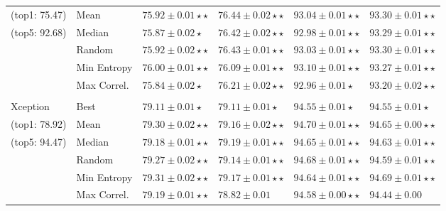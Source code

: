 \documentclass{elsarticle}
\begin{document}
\begin{table}[h!]
\begin{tabularx}{\textwidth}{XX|YY|YY}
		(top1: 75.47)                    & Mean                     & $75.92 \pm 0.01 \star\star$          & $\mathbf{76.44 \pm 0.02} \star\star$ & $93.04 \pm 0.01\star\star$          & $93.30 \pm 0.01\star\star$          \\
		(top5: 92.68)                    & Median                   & $ 75.87 \pm 0.02 \star$              & $ 76.42 \pm 0.02 \star\star$         & $92.98 \pm 0.01\star\star$          & $93.29 \pm 0.01\star\star$          \\
		                               & Random                   & $75.92 \pm 0.02 \star\star$          & $76.43 \pm 0.01 \star\star$          & $93.03 \pm 0.01\star\star$          & $93.30 \pm 0.01\star\star$          \\
		                               & Min Entropy              & $\mathbf{76.00\pm0.01\star\star}$    & $76.09\pm0.01\star\star$             & $\mathbf{93.10\pm0.01\star\star}$   & $\mathbf{93.27\pm0.01\star\star}$   \\
		                               & Max Correl.              & $75.84\pm0.02\star$                  & $76.21\pm0.02\star\star$             & $92.96\pm0.01\star$                 & $93.20\pm0.02\star\star$            \\
		                               &                          &                                      &                                      &                                     &                                     \\
		{ Xception}                    & Best                     & $79.11 \pm 0.01 \star$               & $79.11 \pm 0.01 \star$               & $94.55 \pm 0.01\star$               & $94.55 \pm 0.01\star$               \\
		(top1: 78.92)                    & Mean                     & $\mathbf{79.30 \pm 0.02} \star\star$ & $79.16 \pm 0.02 \star\star$          & $\mathbf{94.70 \pm 0.01}\star\star$ & $94.65 \pm 0.00\star\star$          \\
		(top5: 94.47)                    & Median                   & $79.18 \pm 0.01 \star\star$          & $\mathbf{79.19 \pm 0.01 \star\star}$ & $94.65 \pm 0.01\star\star$          & $94.63 \pm 0.01\star\star$          \\
		                               & Random                   & $79.27 \pm 0.02 \star\star$          & $79.14\pm 0.01 \star\star$           & $94.68 \pm 0.01\star\star$          & $94.59 \pm 0.01\star\star$          \\
		                               & Min Entropy              & $79.31\pm0.02\star\star$             & $\mathbf{79.17\pm0.01\star\star}$    & $94.64\pm0.01\star\star$            & $\mathbf{94.69\pm0.01\star\star}$   \\
		                               & Max Correl.              & $79.19\pm0.01\star\star$             & $78.82\pm0.01$                       & $94.58\pm0.00\star\star$            & $94.44\pm0.00$                      \\ \bottomrule
	\end{tabularx}
\label{tab:results1}


	\end{table}
\end{document}
